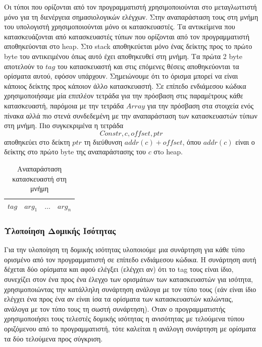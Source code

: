 \documentclass[12pt]{article}
\begin{document}
Οι τύποι που ορίζονται από τον προγραμματιστή χρησιμοποιούνται στο μεταγλωττιστή μόνο για τη διενέργεια σημασιολογικών ελέγχων. Στην αναπαράσταση τους στη μνήμη του υπολογιστή χρησιμοποιούνται μόνο οι κατασκευαστές.
Τα αντικείμενα που κατασκευάζονται από κατασκευαστές τύπων που ορίζονται από τον προγραμματιστή αποθηκεύονται στο heap. Στο stack αποθηκεύεται μόνο ένας δείκτης προς το πρώτο byte του αντικειμένου όπως αυτό έχει αποθηκευθεί στη μνήμη.  Τα πρώτα 2 byte αποτελούν το $tag$ του κατασκευαστή και στις επόμενες θέσεις αποθηκεύονται τα ορίσματα αυτού, εφόσον υπάρχουν. Σημειώνουμε ότι το όρισμα μπορεί να είναι κάποιος δείκτης προς κάποιον άλλο κατασκευαστή.
Σε επίπεδο ενδιάμεσου κώδικα χρησιμοποιήσαμε μία επιπλέον τετράδα για την πρόσβαση στις παραμέτρους κάθε κατασκευαστή, παρόμοια με την τετράδα $Array$ για την πρόσβαση στα στοιχεία ενός πίνακα αλλά πιο στενά συνδεδεμένη με την αναπαράσταση των κατασκευαστών τύπων στη μνήμη. Πιο συγκεκριμένα η τετράδα
$$ Constr, c, offset, ptr$$
αποθηκεύει στο δείκτη $ptr$ τη διεύθυνση $addr(c)+offset$, όπου $addr(c)$ είναι ο δείκτης στο πρώτο byte της αναπαράστασης του $c$ στo heap.

\begin{table}[htbp]
\centering
    \begin{tabular}{|l|c|l|l|}
    \hline
    $tag$ & $arg_1$ & $\ldots$ & $arg_n$ \\ \hline
    \end{tabular}
    \caption{Αναπαράσταση κατασκευαστή στη μνήμη}
\end{table}

\subsubsection{Υλοποίηση Δομικής Ισότητας}
Για την υλοποίηση τη δομικής ισότητας υλοποιούμε μια συνάρτηση για κάθε τύπο ορισμένο από τον προγραμματιστή σε επίπεδο ενδιάμεσου κώδικα. Η συνάρτηση αυτή δέχεται δύο ορίσματα και αφού ελέγξει (ελέγχει αν) ότι το tag τους είναι ίδιο, συνεχίζει στον ένα προς ένα έλεγχο των ορισμάτων των κατασκευαστών για ισότητα, χρησιμοποιώντας την κατάλληλη συνάρτηση ανάλογα με τον τύπο τους (εάν είναι ίδιο ελέγχει ένα προς ένα αν είναι ίσα τα ορίσματα των κατασκευαστών καλώντας, ανάλογα με τον τύπο τους τη σωστή συνάρτηση). Όταν ο προγραμματιστής χρησιμοποιήσει τους τελεστές δομικής ισότητας η ανισότητας με τελούμενα τύπου οριζόμενου από το προγραμματιστή, τότε καλείται η ανάλογη συνάρτηση με ορίσματα τα δύο τελούμενα προς σύγκριση. 
\end{document}
